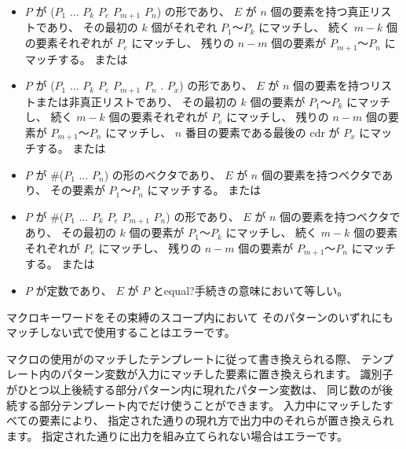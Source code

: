 \begin{entry}
\begin{itemize}
\item $P$ が
      {\cf ($P_1$ $\dots$ $P_k$ $P_e$  $P_{m+1}$ \dotsfoo{} $P_n$)}
      の形であり、
      $E$ が $n$ 個の要素を持つ真正リストであり、
      その最初の $k$ 個がそれぞれ $P_1$〜$P_k$ にマッチし、
      続く $m-k$ 個の要素それぞれが $P_e$ にマッチし、
      残りの $n-m$ 個の要素が $P_{m+1}$〜$P_n$ にマッチする。
      または

\item $P$ が
      {\cf ($P_1$ $\dots$ $P_k$ $P_{e}$  $P_{m+1}$ \dotsfoo{} $P_n$ . $P_x$)}
      の形であり、
      $E$ が $n$ 個の要素を持つリストまたは非真正リストであり、
      その最初の $k$ 個の要素が $P_1$〜$P_k$ にマッチし、
      続く $m-k$ 個の要素それぞれが $P_e$ にマッチし、
      残りの $n-m$ 個の要素が $P_{m+1}$〜$P_n$ にマッチし、
      $n$ 番目の要素である最後の cdr が $P_x$ にマッチする。
      または

\item $P$ が {\cf \#($P_1$ $\dots$ $P_n$)} の形のベクタであり、
      $E$ が $n$ 個の要素を持つベクタであり、
      その要素が $P_1$〜$P_n$ にマッチする。
      または

\item $P$ が
      {\cf \#($P_1$ $\dots$ $P_k$ $P_{e}$  $P_{m+1}$ \dotsfoo $P_n$)}
      の形であり、
      $E$ が $n$ 個の要素を持つベクタであり、
      その最初の $k$ 個の要素が $P_1$〜$P_k$ にマッチし、
      続く $m-k$ 個の要素それぞれが $P_e$ にマッチし、
      残りの $n-m$ 個の要素が $P_{m+1}$〜$P_n$ にマッチする。
      または

\item $P$ が定数であり、 $E$ が $P$ と{\cf equal?}手続きの意味において等しい。
\end{itemize}

マクロキーワードをその束縛のスコープ内において
そのパターンのいずれにもマッチしない式で使用することはエラーです。

マクロの使用がのマッチしたテンプレートに従って書き換えられる際、
テンプレート内のパターン変数が入力にマッチした要素に置き換えられます。
識別子がひとつ以上後続する部分パターン内に現れたパターン変数は、
同じ数のが後続する部分テンプレート内でだけ使うことができます。
入力中にマッチしたすべての要素により、
指定された通りの現れ方で出力中のそれらが置き換えられます。
指定された通りに出力を組み立てられない場合はエラーです。



\end{entry}

